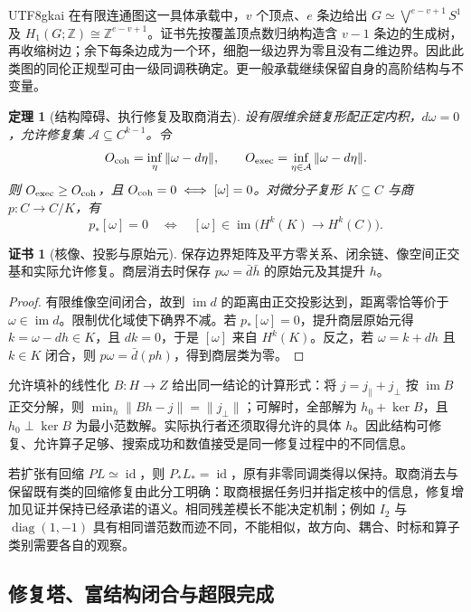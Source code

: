 \documentclass[11pt,a4paper]{article}
\theoremstyle{plain}
\newtheorem{theorem}{定理}[section]
\theoremstyle{definition}
\newtheorem*{certificate}{证书}
\theoremstyle{remark}
\begin{document}
\begin{CJK*}{UTF8}{gkai}
在有限连通图这一具体承载中，$v$ 个顶点、$e$ 条边给出 $G\simeq\bigvee^{e-v+1}S^1$ 及 $H_1(G;\mathbb Z)\cong\mathbb Z^{e-v+1}$。证书先按覆盖顶点数归纳构造含 $v-1$ 条边的生成树，再收缩树边；余下每条边成为一个环，细胞一级边界为零且没有二维边界。因此此类图的同伦正规型可由一级同调秩确定。更一般承载继续保留自身的高阶结构与不变量。

\begin{theorem}[结构障碍、执行修复及取商消去]
\label{pc:obstruction}
设有限维余链复形配正定内积，$d\omega=0$，允许修复集 $\mathcal A\subseteq C^{k-1}$。令
\[
 O_{\rm coh}=\inf_\eta\|\omega-d\eta\|,
 \qquad O_{\rm exec}=\inf_{\eta\in\mathcal A}\|\omega-d\eta\|.
\]
则 $O_{\rm exec}\ge O_{\rm coh}$，且 $O_{\rm coh}=0\iff[\omega]=0$。对微分子复形 $K\subseteq C$ 与商 $p:C\to C/K$，有
\begin{equation}
\label{pc:eq-obstruction-kernel}
 p_*[\omega]=0\quad\Longleftrightarrow\quad
 [\omega]\in\operatorname{im}\bigl(H^k(K)\to H^k(C)\bigr).
\end{equation}
\end{theorem}
\begin{certificate}[核像、投影与原始元]
保存边界矩阵及平方零关系、闭余链、像空间正交基和实际允许修复。商层消去时保存 $p\omega=\bar d\bar h$ 的原始元及其提升 $h$。
\end{certificate}
\begin{proof}
有限维像空间闭合，故到 $\operatorname{im}d$ 的距离由正交投影达到，距离零恰等价于 $\omega\in\operatorname{im}d$。限制优化域使下确界不减。若 $p_*[\omega]=0$，提升商层原始元得 $k=\omega-dh\in K$，且 $dk=0$，于是 $[\omega]$ 来自 $H^k(K)$。反之，若 $\omega=k+dh$ 且 $k\in K$ 闭合，则 $p\omega=\bar d(ph)$，得到商层类为零。
\end{proof}

允许填补的线性化 $B:H\to Z$ 给出同一结论的计算形式：将 $j=j_{\parallel}+j_{\perp}$ 按 $\operatorname{im}B$ 正交分解，则 $\min_h\|Bh-j\|=\|j_{\perp}\|$；可解时，全部解为 $h_0+\ker B$，且 $h_0\perp\ker B$ 为最小范数解。实际执行者还须取得允许的具体 $h$。因此结构可修复、允许算子足够、搜索成功和数值接受是同一修复过程中的不同信息。

若扩张有回缩 $P L\simeq\operatorname{id}$，则 $P_*L_*=\operatorname{id}$，原有非零同调类得以保持。取商消去与保留既有类的回缩修复由此分工明确：取商根据任务归并指定核中的信息，修复增加见证并保持已经承诺的语义。相同残差模长不能决定机制；例如 $I_2$ 与 $\operatorname{diag}(1,-1)$ 具有相同谱范数而迹不同，不能相似，故方向、耦合、时标和算子类别需要各自的观察。

\subsection{修复塔、富结构闭合与超限完成}


\end{CJK*}
\end{document}
